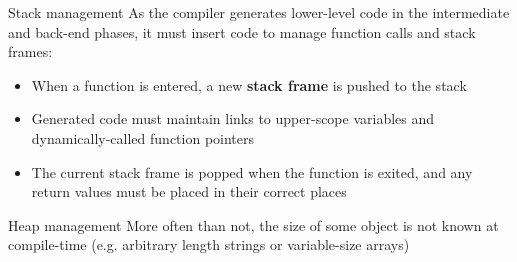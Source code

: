 \documentclass[../index.tex]{subfiles}
\begin{document}
\begin{frame}[fragile]{\currenttitle}
\begin{columns}
\begin{column}{0.3\textwidth}
    \end{column}
  \end{columns}
\end{frame}

\renewcommand{\currenttitle}{Stack management}
\begin{frame}[fragile]{\currenttitle}
  As the compiler generates lower-level code in the intermediate and back-end
  phases, it must insert code to manage function calls and stack frames:
  
  \begin{itemize}
    \item<2-> When a function is entered, a new \textbf{stack frame} is pushed to
      the stack
    \item<3-> Generated code must maintain links to upper-scope variables and
      dynamically-called function pointers
    \item<4-> The current stack frame is popped when the function is exited, and
      any return values must be placed in their correct places
  \end{itemize}
\end{frame}

\renewcommand{\currenttitle}{Heap management}
\begin{frame}[fragile]{\currenttitle}
  More often than not, the size of some object is not known at compile-time
  (e.g. arbitrary length strings or variable-size arrays) \\[1em]


\end{frame}
\end{document}

